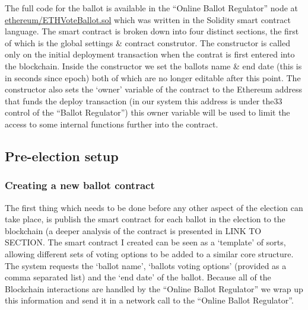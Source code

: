 \documentclass{article}
\begin{document}
The full code for the ballot is available in the ``Online Ballot Regulator'' node at \href{}{{\Large ethereum/ETHVoteBallot.sol}} which was written in the Solidity smart contract language. The smart contract is broken down into four distinct sections, the first of which is the global settings \& contract construtor. The constructor is called only on the initial deployment transaction when the contrat is first entered into the blockchain. Inside the constructor we set the ballots name \& end date (this is in seconds since epoch) both of which are no longer editable after this point. The constructor also sets the `owner' variable of the contract to the Ethereum address that funds the deploy transaction (in our system this address is under the33 control of the ``Ballot Regulator'') this owner variable will be used to limit the access to some internal functions further into the contract.



\cleardoublepage
\subsection{Pre-election setup}
\subsubsection{Creating a new ballot contract}
The first thing which needs to be done before any other aspect of the election can take place, is publish the smart contract for each ballot in the election to the blockchain (a deeper analysis of the contract is presented in {\Large LINK TO SECTION}. The smart contract I created can be seen as a `template' of sorts, allowing different sets of voting options to be added to a similar core structure. The system requests the `ballot name', `ballots voting options' (provided as a comma separated list) and the `end date' of the ballot. Because all of the Blockchain interactions are handled by the ``Online Ballot Regulator'' we wrap up this information and send it in a network call to the ``Online Ballot Regulator''.
\end{document}

